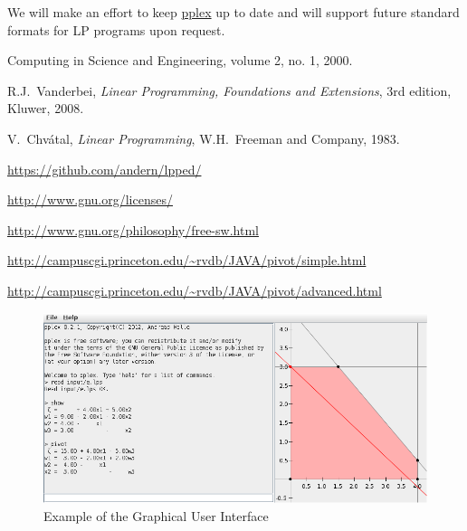 \documentclass[ukenglish]{nik}
\begin{document}
We will make an effort to keep \url{pplex} up to date and will support 
future standard formats for LP programs upon request.


\begin{thebibliography}{99}
 Computing in Science and Engineering, volume 2, no. 1, 2000.

 R.J.~Vanderbei, 
\emph{Linear Programming, Foundations and Extensions},
3rd edition, Kluwer, 2008.

 V.~Chv\'atal,
\emph{Linear Programming},
W.H.~Freeman and Company, 1983.

\url{https://github.com/andern/lpped/}

\url{http://www.gnu.org/licenses/}

\url{http://www.gnu.org/philosophy/free-sw.html}

\url{http://campuscgi.princeton.edu/~rvdb/JAVA/pivot/simple.html}

\url{http://campuscgi.princeton.edu/~rvdb/JAVA/pivot/advanced.html}

\end{thebibliography}

\begin{figure}[htpb]
	\begin{center}
		\includegraphics[width=\textwidth]{ex_gui.jpg}
	\end{center}
	\caption{Example of the Graphical User Interface}
	\label{fig:ex_gui}
\end{figure}
\end{document}
